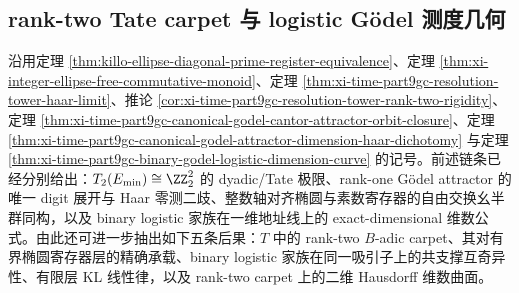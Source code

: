 \subsection{rank-two Tate carpet 与 logistic Gödel 测度几何}\label{subsec:conclusion-rank-two-tate-carpet-logistic-geometry}
沿用定理 \ref{thm:killo-ellipse-diagonal-prime-register-equivalence}、定理 \ref{thm:xi-integer-ellipse-free-commutative-monoid}、定理 \ref{thm:xi-time-part9gc-resolution-tower-haar-limit}、推论 \ref{cor:xi-time-part9gc-resolution-tower-rank-two-rigidity}、定理 \ref{thm:xi-time-part9gc-canonical-godel-cantor-attractor-orbit-closure}、定理 \ref{thm:xi-time-part9gc-canonical-godel-attractor-dimension-haar-dichotomy} 与定理 \ref{thm:xi-time-part9gc-binary-godel-logistic-dimension-curve} 的记号。前述链条已经分别给出：\(T_2(E_{\min})\cong \ZZ_2^2\) 的 dyadic/Tate 极限、rank-one Gödel attractor 的唯一 digit 展开与 Haar 零测二歧、整数轴对齐椭圆与素数寄存器的自由交换幺半群同构，以及 binary logistic 家族在一维地址线上的 exact-dimensional 维数公式。由此还可进一步抽出如下五条后果：\(T\) 中的 rank-two \(B\)-adic carpet、其对有界椭圆寄存器层的精确承载、binary logistic 家族在同一吸引子上的共支撑互奇异性、有限层 KL 线性律，以及 rank-two carpet 上的二维 Hausdorff 维数曲面。

